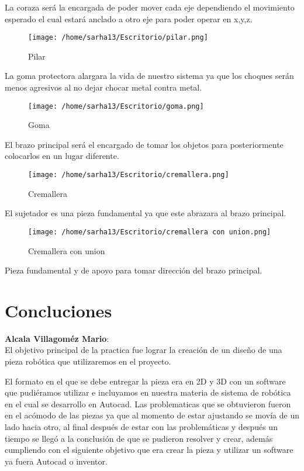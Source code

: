 \documentclass[12pt,a4paper]{report}
\begin{document}
La coraza será la encargada de poder mover cada eje  dependiendo el movimiento esperado el cual estará anclado a otro eje para poder operar en x,y,z.\\

\begin{figure}[htp]
\centering
\texttt{[image: /home/sarha13/Escritorio/pilar.png]}
\caption{Pilar}
\label{Figura 4.}
\end{figure}

La goma protectora alargara la vida de nuestro sistema ya que los choques serán menos agresivos  al no dejar chocar metal contra metal.\\

\begin{figure}[htp]
\centering
\texttt{[image: /home/sarha13/Escritorio/goma.png]}
\caption{Goma}
\label{Figura 5.}
\end{figure}

El brazo principal será el encargado de  tomar los objetos para posteriormente colocarlos en un lugar diferente.\\

\begin{figure}[htp]
\centering
\texttt{[image: /home/sarha13/Escritorio/cremallera.png]}
\caption{Cremallera}
\label{Figura 6.}
\end{figure}

El sujetador es una pieza fundamental ya que este abrazara al brazo principal.\\

\begin{figure}[htp]
\centering
\texttt{[image: /home/sarha13/Escritorio/cremallera con union.png]}
\caption{Cremallera con union}
\label{Figura 6.}
\end{figure}

Pieza fundamental y de apoyo para tomar dirección del brazo principal.\\

\newpage

\section{Concluciones}

\textbf{Alcala Villagom\'ez Mario}:\\
El objetivo principal de la practica fue lograr la creaci\'on de un diseño de una pieza rob\'otica que utilizaremos en el proyecto.

El formato en el  que se debe entregar  la pieza era en 2D y 3D con un software que pudi\'eramos utilizar e incluyamos en nuestra materia de sistema de robótica en el cual se desarrollo en Autocad. Las problematicas que se obtuvieron fueron en el acómodo de las piezas ya que al momento de estar ajustando se movía de un lado hacia otro, al final después de estar con las problemáticas y después un tiempo se llegó a la conclusi\'on de que se pudieron resolver y crear, además cumpliendo con el siguiente objetivo que era crear la pieza y utilizar un software ya fuera Autocad o inventor.\\
\end{document}
